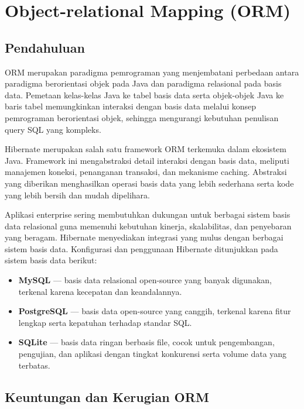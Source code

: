 \chapter{Object-relational Mapping (ORM)}

\section{Pendahuluan}

ORM merupakan paradigma pemrograman yang menjembatani perbedaan antara paradigma berorientasi objek pada Java dan paradigma relasional pada basis data. Pemetaan kelas-kelas Java ke tabel basis data serta objek-objek Java ke baris tabel memungkinkan interaksi dengan basis data melalui konsep pemrograman berorientasi objek, sehingga mengurangi kebutuhan penulisan query SQL yang kompleks.

Hibernate merupakan salah satu framework ORM terkemuka dalam ekosistem Java. Framework ini mengabstraksi detail interaksi dengan basis data, meliputi manajemen koneksi, penanganan transaksi, dan mekanisme caching. Abstraksi yang diberikan menghasilkan operasi basis data yang lebih sederhana serta kode yang lebih bersih dan mudah dipelihara.

Aplikasi enterprise sering membutuhkan dukungan untuk berbagai sistem basis data relasional guna memenuhi kebutuhan kinerja, skalabilitas, dan penyebaran yang beragam. Hibernate menyediakan integrasi yang mulus dengan berbagai sistem basis data. Konfigurasi dan penggunaan Hibernate ditunjukkan pada sistem basis data berikut:
\begin{itemize}
	\item \textbf{MySQL} --- basis data relasional open-source yang banyak digunakan, terkenal karena kecepatan dan keandalannya.
	\item \textbf{PostgreSQL} --- basis data open-source yang canggih, terkenal karena fitur lengkap serta kepatuhan terhadap standar SQL.
	\item \textbf{SQLite} --- basis data ringan berbasis file, cocok untuk pengembangan, pengujian, dan aplikasi dengan tingkat konkurensi serta volume data yang terbatas.
\end{itemize}



\section{Keuntungan dan Kerugian ORM}

